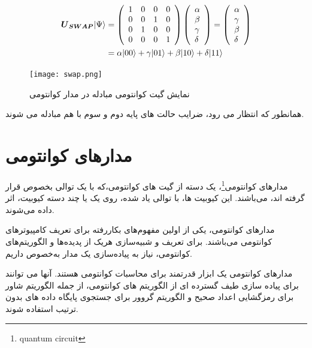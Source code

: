 \documentclass{book}
\begin{document}
\begin{center}
	$$\begin{aligned}
		\boldsymbol{U}_{\boldsymbol{SWAP}}|\Psi\rangle & =\left(\begin{array}{llll}
			1 & 0 & 0 & 0 \\
			0 & 0 & 1 & 0 \\
			0 & 1 & 0 & 0 \\
			0 & 0 & 0 & 1
		\end{array}\right)\left(\begin{array}{l}
			\alpha \\
			\beta \\
			\gamma \\
			\delta
		\end{array}\right)=\left(\begin{array}{l}
			\alpha \\
			\gamma \\
			\beta \\
			\delta
		\end{array}\right) \\
		\vspace{2cm}
		& =\alpha|00\rangle+\gamma|01\rangle+\beta|10\rangle+\delta|11\rangle
	\end{aligned}$$
\end{center}





\begin{figure}[ht]
	\centering
	\texttt{[image: swap.png]}
	\caption{نمایش گیت کوانتومی مبادله در مدار کوانتومی}
	\label{SWAP}
\end{figure}



همانطور که انتظار می رود، ضرایب حالت های پایه دوم و سوم با هم مبادله می شوند.
\newpage
\section{مدار‌های کوانتومی}
مدار‌های ‌کوانتومی\footnote{quantum circuit}، یک دسته از گیت ها‌ی کوانتومی،که با یک توالی بخصوص قرار گرفته اند، ‌می‌باشند. این کیوبیت ها، با توالی یاد شده، روی یک یا چند دسته کیوبیت، اثر داده ‌می‌شوند. 

مدار‌های کوانتومی، یکی از اولین مفهوم‌های بکار‌رفته برای تعریف کامپیوتر‌های کوانتومی‌ می‌باشند. برای تعریف و شبیه‌سازی هریک از پدیده‌ها و الگوریتم‌های کوانتومی، نیاز به پیاده‌سازی یک مدار به‌خصوص داریم.


مدارهای کوانتومی یک ابزار قدرتمند برای محاسبات کوانتومی هستند. آنها می توانند برای پیاده سازی طیف گسترده ای از الگوریتم های کوانتومی، از جمله الگوریتم شاور برای رمزگشایی اعداد صحیح و الگوریتم گروور برای جستجوی پایگاه داده های بدون ترتیب استفاده شوند.
\end{document}
